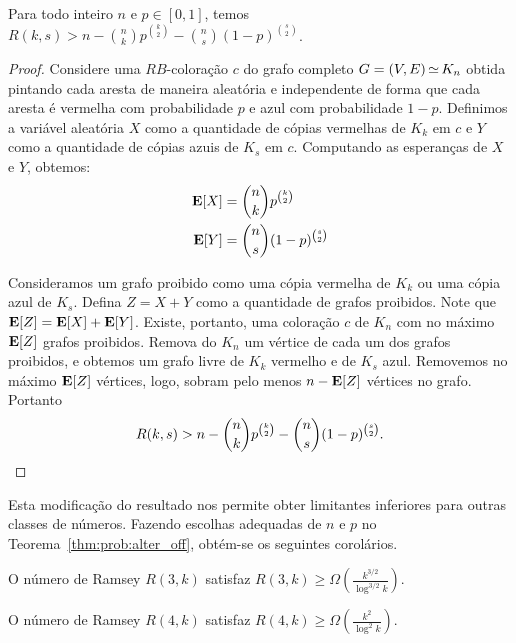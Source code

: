 \begin{theorem}
\label{thm:prob:alter_off}
Para todo inteiro $n$ e $p \in [0,1]$, temos $\displaystyle R(k, s) > n - \binom{n}{k}p^{\binom{k}{2}} - \binom{n}{s}(1-p)^{\binom{s}{2}}$.
\end{theorem}
\begin{proof}
Considere uma $RB$-coloração $c$ do grafo completo $G = (V,E) \operatorname{\simeq} K_n$ obtida pintando cada aresta de maneira aleatória e independente de forma que cada aresta é vermelha com probabilidade $p$ e azul com probabilidade $1-p$.
Definimos a variável aleatória $X$ como a quantidade de cópias vermelhas de $K_k$ em $c$ e $Y$ como a quantidade de cópias azuis de $K_s$ em $c$. Computando as esperanças de $X$ e $Y$, obtemos:
\begin{align*}
\operatorname{\mathbf{E}}[X] &= \binom{n}{k}p^{\binom{k}{2}} \\
\operatorname{\mathbf{E}}[Y] &= \binom{n}{s}(1-p)^{\binom{s}{2}}
\end{align*}

Consideramos um grafo proibido como uma cópia vermelha de $K_k$ ou uma cópia azul de $K_s$. Defina $Z = X + Y$ como a quantidade de grafos proibidos. Note que $\operatorname{\mathbf{E}}[Z] = \operatorname{\mathbf{E}}[X] + \operatorname{\mathbf{E}}[Y]$. Existe, portanto, uma coloração $c$ de $K_n$ com no máximo $\operatorname{\mathbf{E}}[Z]$ grafos proibidos. Remova do $K_n$ um vértice de cada um dos grafos proibidos, e obtemos um grafo livre de $K_k$ vermelho e de $K_s$ azul. Removemos no máximo $\operatorname{\mathbf{E}}[Z]$ vértices, logo, sobram pelo menos $n - \operatorname{\mathbf{E}}[Z] $ vértices no grafo. Portanto
\[ R(k, s) > n - \binom{n}{k}p^{\binom{k}{2}} - \binom{n}{s}(1-p)^{\binom{s}{2}}.  \qedhere\]
\end{proof}

Esta modificação do resultado nos permite obter limitantes inferiores para outras classes de números. Fazendo escolhas adequadas de $n$ e $p$ no Teorema~\ref{thm:prob:alter_off}, obtém-se os seguintes corolários.

\begin{noproofcorollary}
O número de Ramsey $R(3,k)$ satisfaz $\displaystyle R(3,k) \geq  \Omega\left( \frac{k^{3/2}}{\log^{3/2} k}\right)$.
\end{noproofcorollary}

\begin{noproofcorollary}
O número de Ramsey $R(4,k)$ satisfaz $\displaystyle R(4,k) \geq  \Omega\left( \frac{k^2}{\log^2 k}\right)$.
\end{noproofcorollary}

